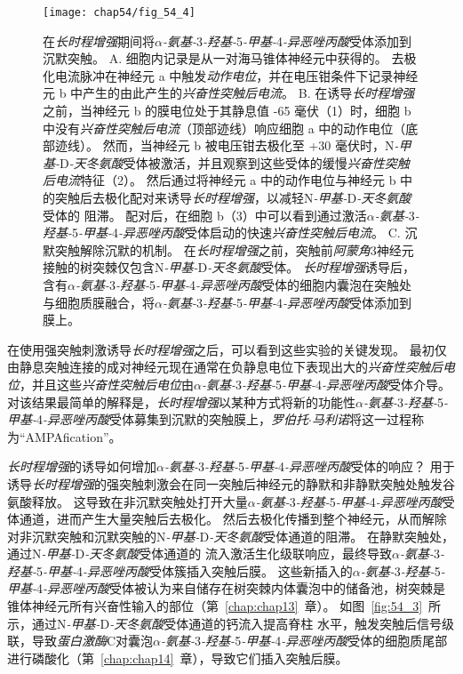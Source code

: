 \begin{figure}[htbp]
	\centering
	\texttt{[image: chap54/fig\_54\_4]}
	\caption{在\textit{长时程增强}期间将\textit{$\alpha$-氨基-}3\textit{-羟基-}5\textit{-甲基-}4\textit{-异恶唑丙酸}受体添加到沉默突触。
		A. 细胞内记录是从一对海马锥体神经元中获得的。
		去极化电流脉冲在神经元 a 中触发\textit{动作电位}，并在电压钳条件下记录神经元 b 中产生的由此产生的\textit{兴奋性突触后电流}。
		B. 在诱导\textit{长时程增强}之前，当神经元 b 的膜电位处于其静息值 -65 毫伏（1）时，细胞 b 中没有\textit{兴奋性突触后电流}（顶部迹线）响应细胞 a 中的动作电位（底部迹线）。
		然而，当神经元 b 被电压钳去极化至 +30 毫伏时，N\textit{-甲基-}D\textit{-天冬氨酸}受体被激活，并且观察到这些受体的缓慢\textit{兴奋性突触后电流}特征（2）。
		然后通过将神经元 a 中的动作电位与神经元 b 中的突触后去极化配对来诱导\textit{长时程增强}，以减轻N\textit{-甲基-}D\textit{-天冬氨酸}受体的  阻滞。
		配对后，在细胞 b（3）中可以看到通过激活\textit{$\alpha$-氨基-}3\textit{-羟基-}5\textit{-甲基-}4\textit{-异恶唑丙酸}受体启动的快速\textit{兴奋性突触后电流}\cite{montgomery2001pair}。
		C. 沉默突触解除沉默的机制。
		在\textit{长时程增强}之前，突触前\textit{阿蒙角}3神经元接触的树突棘仅包含N\textit{-甲基-}D\textit{-天冬氨酸}受体。
		\textit{长时程增强}诱导后，含有\textit{$\alpha$-氨基-}3\textit{-羟基-}5\textit{-甲基-}4\textit{-异恶唑丙酸}受体的细胞内囊泡在突触处与细胞质膜融合，将\textit{$\alpha$-氨基-}3\textit{-羟基-}5\textit{-甲基-}4\textit{-异恶唑丙酸}受体添加到膜上。}
	\label{fig:54_4}
\end{figure}


在使用强突触刺激诱导\textit{长时程增强}之后，可以看到这些实验的关键发现。
最初仅由静息突触连接的成对神经元现在通常在负静息电位下表现出大的\textit{兴奋性突触后电位}，并且这些\textit{兴奋性突触后电位}由\textit{$\alpha$-氨基-}3\textit{-羟基-}5\textit{-甲基-}4\textit{-异恶唑丙酸}受体介导。
对该结果最简单的解释是，\textit{长时程增强}以某种方式将新的功能性\textit{$\alpha$-氨基-}3\textit{-羟基-}5\textit{-甲基-}4\textit{-异恶唑丙酸}受体募集到沉默的突触膜上，\textit{罗伯托$\cdot$马利诺}将这一过程称为“AMPAfication”。


\textit{长时程增强}的诱导如何增加\textit{$\alpha$-氨基-}3\textit{-羟基-}5\textit{-甲基-}4\textit{-异恶唑丙酸}受体的响应？
用于诱导\textit{长时程增强}的强突触刺激会在同一突触后神经元的静默和非静默突触处触发谷氨酸释放。
这导致在非沉默突触处打开大量\textit{$\alpha$-氨基-}3\textit{-羟基-}5\textit{-甲基-}4\textit{-异恶唑丙酸}受体通道，进而产生大量突触后去极化。
然后去极化传播到整个神经元，从而解除  对非沉默突触和沉默突触的N\textit{-甲基-}D\textit{-天冬氨酸}受体通道的阻滞。
在静默突触处，通过N\textit{-甲基-}D\textit{-天冬氨酸}受体通道的  流入激活生化级联响应，最终导致\textit{$\alpha$-氨基-}3\textit{-羟基-}5\textit{-甲基-}4\textit{-异恶唑丙酸}受体簇插入突触后膜。
这些新插入的\textit{$\alpha$-氨基-}3\textit{-羟基-}5\textit{-甲基-}4\textit{-异恶唑丙酸}受体被认为来自储存在树突棘内体囊泡中的储备池，树突棘是锥体神经元所有兴奋性输入的部位（第~\ref{chap:chap13}~章）。
如图~\ref{fig:54_3}~所示，通过N\textit{-甲基-}D\textit{-天冬氨酸}受体通道的钙流入提高脊柱  水平，触发突触后信号级联，导致\textit{蛋白激酶}C对囊泡\textit{$\alpha$-氨基-}3\textit{-羟基-}5\textit{-甲基-}4\textit{-异恶唑丙酸}受体的细胞质尾部进行磷酸化（第~\ref{chap:chap14}~章），导致它们插入突触后膜。


